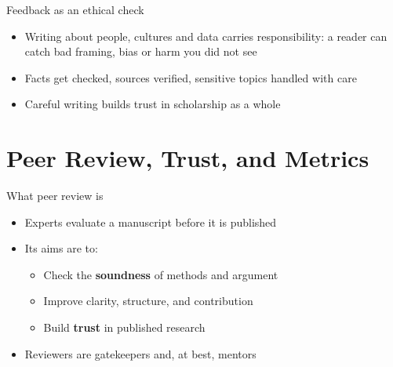 \documentclass[aspectratio=169]{beamer}
\begin{document}
\begin{frame}{Feedback as an ethical check}
\begin{itemize}
  \item Writing about people, cultures and data carries responsibility: a reader can catch bad framing, bias or harm you did not see
  \item Facts get checked, sources verified, sensitive topics handled with care
  \item Careful writing builds trust in scholarship as a whole
\end{itemize}
\end{frame}



\section{Peer Review, Trust, and Metrics}

\begin{frame}{What peer review is}
\begin{itemize}
  \item Experts evaluate a manuscript before it is published
  \item Its aims are to:
    \begin{itemize}
      \item Check the \textbf{soundness} of methods and argument
      \item Improve clarity, structure, and contribution
      \item Build \textbf{trust} in published research
    \end{itemize}
  \item Reviewers are gatekeepers and, at best, mentors
\end{itemize}
\end{frame}
\end{document}
